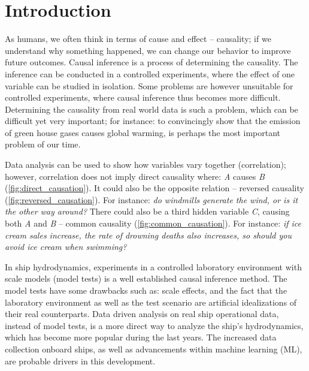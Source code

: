 \section{Introduction}

As humans, we often think in terms of cause and effect -- causality; if we understand why something happened, we can change our behavior to improve future outcomes. 
Causal inference is a process of determining the causality. The inference can be conducted in a controlled experiments, where the effect of one variable can be studied in isolation.
Some problems are however unsuitable for controlled experiments, where causal inference thus becomes more difficult. Determining the causality from real world data is such a problem, which can be difficult yet very important; for instance: to convincingly show that the emission of green house gases causes global warming, is perhaps the most important problem of our time. 

Data analysis can be used to show how variables vary together (correlation); however, correlation does not imply direct causality where: \emph{A} causes \emph{B} (\autoref{fig:direct_causation}). It could also be the opposite relation -- reversed causality (\autoref{fig:reversed_causation}). 
For instance: \emph{do windmills generate the wind, or is it the other way around?} There could also be a third hidden variable \emph{C}, causing both \emph{A} and \emph{B} -- common causality (\autoref{fig:common_causation}). For instance: \emph{if ice cream sales increase, the rate of drowning deaths also increases, so should you avoid ice cream when swimming?}


In ship hydrodynamics, experiments in a controlled laboratory environment with scale models (model tests) is a well established causal inference method.  
The model tests have some drawbacks such as: scale effects, and the fact that the laboratory environment as well as the test scenario are artificial idealizations of their real counterparts.
Data driven analysis on real ship operational data, instead of model tests, is a more direct way to analyze the ship's hydrodynamics, which has become more popular during the last years. The increased data collection onboard ships, as well as advancements within machine learning (ML), are probable drivers in this development. 

